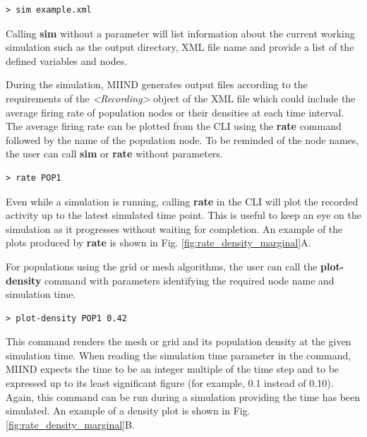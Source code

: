 \documentclass[utf8]{frontiersSCNS} %
\begin{document}
\begin{lstlisting}[language=xml,caption={Load a simulation file in the CLI.}]
> sim example.xml
\end{lstlisting}

Calling \textbf{sim} without a parameter will list information about the current working simulation such as the output directory, XML file name and provide a list of the defined variables and nodes.

During the simulation, MIIND generates output files according to the requirements of the \textit{\textless Recording\textgreater} object of the XML file which could include the average firing rate of population nodes or their densities at each time interval. The average firing rate can be plotted from the CLI using the \textbf{rate} command followed by the name of the population node. To be reminded of the node names, the user can call \textbf{sim} or \textbf{rate} without parameters.

\begin{lstlisting}[language=xml,caption={Plot the rate of population POP1 in the CLI.}]
> rate POP1
\end{lstlisting}

Even while a simulation is running, calling \textbf{rate} in the CLI will plot the recorded activity up to the latest simulated time point. This is useful to keep an eye on the simulation as it progresses without waiting for completion. An example of the plots produced by \textbf{rate} is shown in Fig. \ref{fig:rate_density_marginal}A.

For populations using the grid or mesh algorithms, the user can call the \textbf{plot-density} command with parameters identifying the required node name and simulation time. 

\begin{lstlisting}[language=xml,caption={Plot the probability density of population POP1 at time 0.42s in the CLI.}]
> plot-density POP1 0.42
\end{lstlisting}

This command renders the mesh or grid and its population density at the given simulation time. When reading the simulation time parameter in the command, MIIND expects the time to be an integer multiple of the time step and to be expressed up to its least significant figure (for example, 0.1 instead of 0.10). Again, this command can be run during a simulation providing the time has been simulated. An example of a density plot is shown in Fig. \ref{fig:rate_density_marginal}B.
\end{document}
